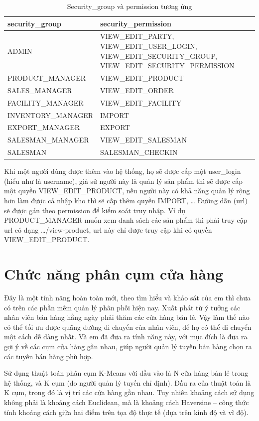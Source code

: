 \begin{table}[H]
\centering
\begin{tabular}{| m{5cm} | m{10cm} |}
\hline
\textbf{security\_group} & \textbf{security\_permission} \\
\hline
ADMIN &
VIEW\_EDIT\_PARTY, VIEW\_EDIT\_USER\_LOGIN,
VIEW\_EDIT\_SECURITY\_GROUP,
VIEW\_EDIT\_SECURITY\_PERMISSION \\
\hline
PRODUCT\_MANAGER &
VIEW\_EDIT\_PRODUCT \\
\hline
SALES\_MANAGER & 
VIEW\_EDIT\_ORDER \\
\hline
FACILITY\_MANAGER & 
VIEW\_EDIT\_FACILITY \\
\hline
INVENTORY\_MANAGER & 
IMPORT \\
\hline
EXPORT\_MANAGER &
EXPORT \\
\hline
SALESMAN\_MANAGER &
VIEW\_EDIT\_SALESMAN \\
\hline
SALESMAN &
SALESMAN\_CHECKIN \\
\hline
\end{tabular}
\caption{Security\_group và permission tương ứng}
\end{table}

Khi một người dùng được thêm vào hệ thống, họ sẽ được cấp một
user\_login (hiểu như là username), giả sử người này là quản lý
sản phẩm thì sẽ được cấp một quyền VIEW\_EDIT\_PRODUCT, nếu người này
có khả năng quản lý rộng hơn làm được cả nhập kho thì sẽ cấp thêm
quyền IMPORT, … Đường dẫn (url) sẽ được gán theo permission để
kiểm soát truy nhập. Ví dụ PRODUCT\_MANAGER muốn xem danh sách các
sản phẩm thì phải truy cập url có dạng …/view-product,
url này chỉ được truy cập khi có quyền VIEW\_EDIT\_PRODUCT.

\section{Chức năng phân cụm cửa hàng}
Đây là một tính năng hoàn toàn mới, theo tìm hiểu và khảo sát của em
thì chưa có trên các phần mềm quản lý phân phối hiện nay. Xuất phát
từ ý tưởng các nhân viên bán hàng hằng ngày phải thăm các cửa hàng bán
lẻ. Vậy làm thế nào có thể tối ưu được quãng đường di chuyển của nhân
viên, để họ có thể di chuyển một cách dễ dàng nhất. Và em đã đưa
ra tính năng này, với mục đích là đưa ra gợi ý về các cụm
cửa hàng gần nhau, giúp người quản lý tuyến bán hàng chọn ra các
tuyến bán hàng phù hợp.

Sử dụng thuật toán phân cụm K-Means với đầu vào là N cửa
hàng bán lẻ trong hệ thống, và K cụm (do người quản lý tuyến
chỉ định). Đầu ra của thuật toán là K cụm, trong đó là vị trí
các cửa hàng gần nhau. Tuy nhiên khoảng cách sử dụng không phải là
khoảng cách Euclidean, mà là khoảng cách Haversine – công thức
tính khoảng cách giữa hai điểm trên tọa độ thực tế
(dựa trên kinh độ và vĩ độ).

